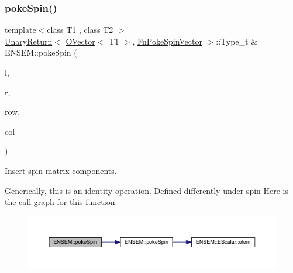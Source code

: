 \subsubsection{\texorpdfstring{pokeSpin()}{pokeSpin()}\hspace{0.1cm}{\footnotesize\ttfamily [2/2]}}
{\footnotesize\ttfamily template$<$class T1 , class T2 $>$ \\
\mbox{\hyperlink{structENSEM_1_1UnaryReturn}{Unary\+Return}}$<$ \mbox{\hyperlink{classENSEM_1_1OVector}{O\+Vector}}$<$ T1 $>$, \mbox{\hyperlink{structENSEM_1_1FnPokeSpinVector}{Fn\+Poke\+Spin\+Vector}} $>$\+::Type\+\_\+t \& E\+N\+S\+E\+M\+::poke\+Spin (\begin{DoxyParamCaption}\item[{\mbox{\hyperlink{classENSEM_1_1OVector}{O\+Vector}}$<$ T1 $>$ \&}]{l,  }\item[{const \mbox{\hyperlink{classENSEM_1_1OVector}{O\+Vector}}$<$ T2 $>$ \&}]{r,  }\item[{int}]{row,  }\item[{int}]{col }\end{DoxyParamCaption})\hspace{0.3cm}{\ttfamily [inline]}}



Insert spin matrix components. 

Generically, this is an identity operation. Defined differently under spin Here is the call graph for this function\+:\nopagebreak
\begin{figure}[H]
\begin{center}
\leavevmode
\includegraphics[width=350pt]{da/d59/group__obsvector_ga8b52874ec438b5bc2c6faef41097b352_cgraph}
\end{center}
\end{figure}
\mbox{\label{group__obsvector_ga48ab93692ad432295c8498d12a368861}} 
